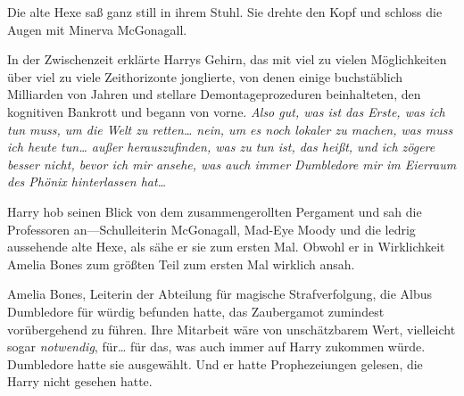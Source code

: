 Die alte Hexe saß ganz still in ihrem Stuhl. Sie drehte den Kopf und schloss die Augen mit Minerva McGonagall.

In der Zwischenzeit erklärte Harrys Gehirn, das mit viel zu vielen Möglichkeiten über viel zu viele Zeithorizonte jonglierte, von denen einige buchstäblich Milliarden von Jahren und stellare Demontageprozeduren beinhalteten, den kognitiven Bankrott und begann von vorne.
\emph{Also gut, was ist das \emph{Erste}, was ich tun muss, um die Welt zu retten… nein, um es noch lokaler zu machen, was muss ich heute tun… außer herauszufinden, was zu tun ist, das heißt, und ich zögere besser nicht, bevor ich mir ansehe, was auch immer Dumbledore mir im Eierraum des Phönix hinterlassen hat…}

Harry hob seinen Blick von dem zusammengerollten Pergament und sah die Professoren an—Schulleiterin McGonagall, Mad-Eye Moody und die ledrig aussehende alte Hexe, als sähe er sie zum ersten Mal. Obwohl er in Wirklichkeit Amelia Bones zum größten Teil zum ersten Mal wirklich ansah.

Amelia Bones, Leiterin der Abteilung für magische Strafverfolgung, die Albus Dumbledore für würdig befunden hatte, das Zaubergamot zumindest vorübergehend zu führen. Ihre Mitarbeit wäre von unschätzbarem Wert, vielleicht sogar \emph{notwendig}, für… für das, was auch immer auf Harry zukommen würde. Dumbledore hatte sie ausgewählt. Und er hatte Prophezeiungen gelesen, die Harry nicht gesehen hatte.

